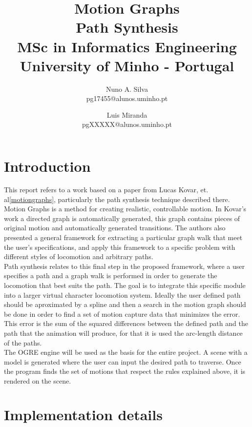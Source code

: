 \documentclass[a4paper]{article}
\title{ Motion Graphs \\ Path Synthesis \\
\small MSc in Informatics Engineering \\
\small University of Minho - Portugal
	 }
\author{
Nuno A. Silva\\ \small pg17455@alunos.uminho.pt \\
\and
Luis Miranda\\ \small pgXXXXX@alunos.uminho.pt \\
}
\begin{document}
\maketitle



\section{Introduction}
This report refers to a work based on a paper from Lucas Kovar, et. al\ref{motiongraphs}, particularly the path synthesis technique described there. Motion Graphs is a method for creating realistic, controllable motion. In Kovar's work a directed graph is automatically generated, this graph contains pieces of original motion and automatically generated transitions. The authors also presented a general framework for extracting a particular graph walk that meet the user's specifications, and apply this framework to a specific problem with different styles of locomotion and arbitrary paths. \\

Path synthesis relates to this final step in the proposed framework, where a user specifies a path and a graph walk is performed in order to generate the locomotion that best suits the path. The goal is to integrate this specific module into a larger virtual character locomotion system. Ideally the user defined path should be aproximated by a spline and then a search in the motion graph should be done in order to find a set of motion capture data that minimizes the error. This error is the sum of the squared differences between the defined path and the path that the animation will produce, for that it is used the arc-length distance of the paths. \\

The OGRE engine will be used as the basis for the entire project. A scene with a model is generated where the user can input the desired path to traverse. Once the program finds the set of motions that respect the rules explained above, it is rendered on the scene.



\section{Implementation details}
\end{document}

